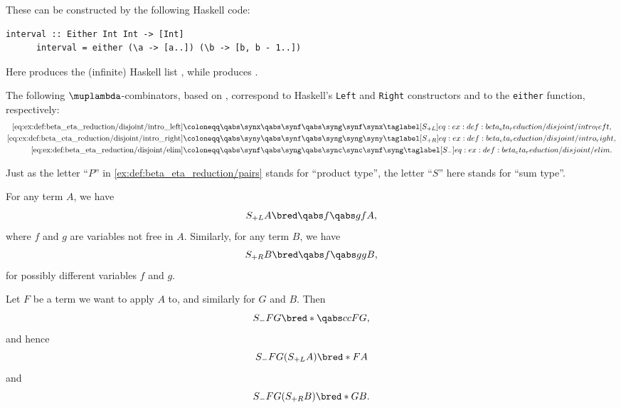 \begin{example}
\begin{thmenum}
    These can be constructed by the following Haskell code:
    \begin{Verbatim}[gobble=4]
      interval :: Either Int Int -> [Int]
      interval = either (\a -> [a..]) (\b -> [b, b - 1..])
    \end{Verbatim}

    Here  produces the (infinite) Haskell list \ManualCodeRef{[a, a + 1, a + 2..]}, while  produces \ManualCodeRef{[b, b - 1, b - 2..]}.

    The following \( \muplambda \)-combinators, based on \cite{MathOF:product_type_in_simply_typed_lambda_terms}, correspond to Haskell's \Verb|Left| and \Verb|Right| constructors and to the \Verb|either| function, respectively:
    \begin{align*}
      \ref{eq:ex:def:beta_eta_reduction/disjoint/intro_left}  &\coloneqq \qabs \synx \qabs \synf \qabs \syng \synf \synx       \taglabel[\ensuremath{ S_{+L} }]{eq:ex:def:beta_eta_reduction/disjoint/intro_left}, \\
      \ref{eq:ex:def:beta_eta_reduction/disjoint/intro_right} &\coloneqq \qabs \syny \qabs \synf \qabs \syng \syng \syny       \taglabel[\ensuremath{ S_{+R} }]{eq:ex:def:beta_eta_reduction/disjoint/intro_right}, \\
      \ref{eq:ex:def:beta_eta_reduction/disjoint/elim}        &\coloneqq \qabs \synf \qabs \syng \qabs \sync \sync \synf \syng \taglabel[\ensuremath{ S_- }]{eq:ex:def:beta_eta_reduction/disjoint/elim}.
    \end{align*}

    Just as the letter \enquote{\( P \)} in \cref{ex:def:beta_eta_reduction/pairs} stands for \enquote{product type}, the letter \enquote{\( S \)} here stands for \enquote{sum type}.

    For any term \( A \), we have
    \begin{equation*}
      S_{+L} A \bred \qabs f \qabs g f A,
    \end{equation*}
    where \( f \) and \( g \) are variables not free in \( A \). Similarly, for any term \( B \), we have
    \begin{equation*}
      S_{+R} B \bred \qabs f \qabs g g B,
    \end{equation*}
    for possibly different variables \( f \) and \( g \).

    Let \( F \) be a term we want to apply \( A \) to, and similarly for \( G \) and \( B \). Then
    \begin{equation*}
      S_- F G \bred* \qabs c c F G,
    \end{equation*}
    and hence
    \begin{equation*}
      S_- F G (S_{+L} A) \bred* F A
    \end{equation*}
    and
    \begin{equation*}
      S_- F G (S_{+R} B) \bred* G B.
    \end{equation*}


\end{thmenum}
\end{example}
